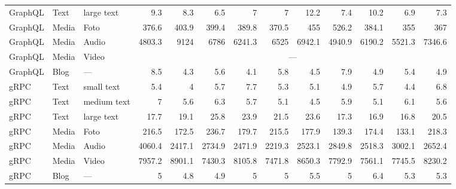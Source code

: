 \begin{table}[p]
{\begin{tabular}{|l|l|l|*{10}{r}|}
					GraphQL & Text & large text  & 9.3 & 8.3 & 6.5 & 7 & 7 & 12.2 & 7.4 & 10.2 & 6.9 & 7.3 \\
					GraphQL & Media & Foto       & 376.6 & 403.9 & 399.4 & 389.8 & 370.5 & 455 & 526.2 & 384.1 & 355 & 367 \\
					GraphQL & Media & Audio      & 4803.3 & 9124 & 6786 & 6241.3 & 6525 & 6942.1 & 4940.9 & 6190.2 & 5521.3 & 7346.6 \\
					GraphQL & Media & Video      & \multicolumn{10}{c|}{—} \\
					GraphQL & Blog  & —          & 8.5 & 4.3 & 5.6 & 4.1 & 5.8 & 4.5 & 7.9 & 4.9 & 5.4 & 4.9 \\
					gRPC & Text & small text     & 5.4 & 4 & 5.7 & 7.7 & 5.3 & 5.1 & 4.9 & 5.7 & 4.4 & 6.8 \\
					gRPC & Text & medium text    & 7 & 5.6 & 6.3 & 5.7 & 5.1 & 4.5 & 5.9 & 5.1 & 6.1 & 5.6 \\
					gRPC & Text & large text     & 17.7 & 19.1 & 25.8 & 23.9 & 21.5 & 23.6 & 17.3 & 16.9 & 16.8 & 20.5 \\
					gRPC & Media & Foto          & 216.5 & 172.5 & 236.7 & 179.7 & 215.5 & 177.9 & 139.3 & 174.4 & 133.1 & 218.3 \\
					gRPC & Media & Audio         & 4060.4 & 2417.1 & 2734.9 & 2471.9 & 2219.3 & 2523.1 & 2849.8 & 2518.3 & 3002.1 & 2652.4 \\
					gRPC & Media & Video         & 7957.2 & 8901.1 & 7430.3 & 8105.8 & 7471.8 & 8650.3 & 7792.9 & 7561.1 & 7745.5 & 8230.2 \\
					gRPC & Blog  & —             & 5 & 4.8 & 4.9 & 5 & 5 & 5.5 & 5 & 6.4 & 5.3 & 5.3 \\
					\hline
			\end{tabular}}
		\end{table}
	

